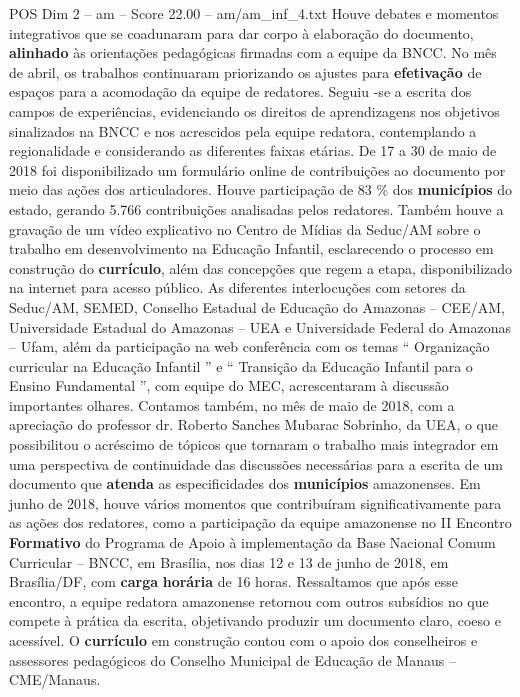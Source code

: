 \begin{textsample}{POS Dim 2 – am – Score 22.00 – am/am\_inf\_4.txt}
Houve debates e momentos integrativos que se coadunaram para dar corpo à elaboração do documento, \textbf{alinhado} às orientações pedagógicas firmadas com a equipe da BNCC.
No mês de abril, os trabalhos continuaram priorizando os ajustes para \textbf{efetivação} de espaços para a acomodação da equipe de redatores.
Seguiu -se a escrita dos campos de experiências, evidenciando os direitos de aprendizagens nos objetivos sinalizados na BNCC e nos acrescidos pela equipe redatora, contemplando a regionalidade e considerando as diferentes faixas etárias.
De 17 a 30 de maio de 2018 foi disponibilizado um formulário online de contribuições ao documento por meio das ações dos articuladores.
Houve participação de 83 \% dos \textbf{municípios} do estado, gerando 5.766 contribuições analisadas pelos redatores.
Também houve a gravação de um vídeo explicativo no Centro de Mídias da Seduc/AM sobre o trabalho em desenvolvimento na Educação Infantil, esclarecendo o processo em construção do \textbf{currículo}, além das concepções que regem a etapa, disponibilizado na internet para acesso público.
As diferentes interlocuções com setores da Seduc/AM, SEMED, Conselho Estadual de Educação do Amazonas – CEE/AM, Universidade Estadual do Amazonas – UEA e Universidade Federal do Amazonas – Ufam, além da participação na web conferência com os temas “ Organização curricular na Educação Infantil ” e “ Transição da Educação Infantil para o Ensino Fundamental ”, com equipe do MEC, acrescentaram à discussão importantes olhares.
Contamos também, no mês de maio de 2018, com a apreciação do professor dr.
Roberto Sanches Mubarac Sobrinho, da UEA, o que possibilitou o acréscimo de tópicos que tornaram o trabalho mais integrador em uma perspectiva de continuidade das discussões necessárias para a escrita de um documento que \textbf{atenda} as especificidades dos \textbf{municípios} amazonenses.
Em junho de 2018, houve vários momentos que contribuíram significativamente para as ações dos redatores, como a participação da equipe amazonense no II Encontro \textbf{Formativo} do Programa de Apoio à implementação da Base Nacional Comum Curricular – BNCC, em Brasília, nos dias 12 e 13 de junho de 2018, em Brasília/DF, com \textbf{carga} \textbf{horária} de 16 horas.
Ressaltamos que após esse encontro, a equipe redatora amazonense retornou com outros subsídios no que compete à prática da escrita, objetivando produzir um documento claro, coeso e acessível.
O \textbf{currículo} em construção contou com o apoio dos conselheiros e assessores pedagógicos do Conselho Municipal de Educação de Manaus – CME/Manaus.

\end{textsample}
